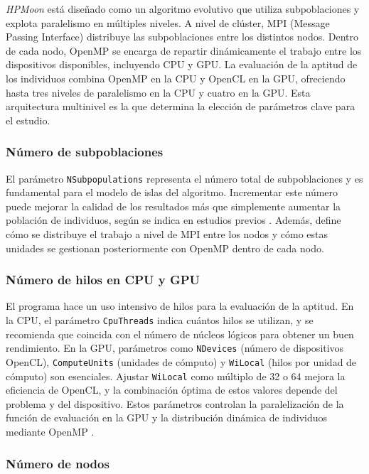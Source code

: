 \textit{HPMoon} está diseñado como un algoritmo evolutivo que utiliza subpoblaciones y explota paralelismo en múltiples niveles. A nivel de clúster, MPI (Message Passing Interface) distribuye las subpoblaciones entre los distintos nodos. Dentro de cada nodo, OpenMP se encarga de repartir dinámicamente el trabajo entre los dispositivos disponibles, incluyendo CPU y GPU. La evaluación de la aptitud de los individuos combina OpenMP en la CPU y OpenCL en la GPU, ofreciendo hasta tres niveles de paralelismo en la CPU y cuatro en la GPU. Esta arquitectura multinivel es la que determina la elección de parámetros clave para el estudio.

\subsubsection{Número de subpoblaciones}

El parámetro \texttt{NSubpopulations} representa el número total de subpoblaciones y es fundamental para el modelo de islas del algoritmo. Incrementar este número puede mejorar la calidad de los resultados más que simplemente aumentar la población de individuos, según se indica en estudios previos \cite{escobar2020energy}. Además, define cómo se distribuye el trabajo a nivel de MPI entre los nodos y cómo estas unidades se gestionan posteriormente con OpenMP dentro de cada nodo.

\subsubsection{Número de hilos en CPU y GPU}

El programa hace un uso intensivo de hilos para la evaluación de la aptitud. En la CPU, el parámetro \texttt{CpuThreads} indica cuántos hilos se utilizan, y se recomienda que coincida con el número de núcleos lógicos para obtener un buen rendimiento. En la GPU, parámetros como \texttt{NDevices} (número de dispositivos OpenCL), \texttt{ComputeUnits} (unidades de cómputo) y \texttt{WiLocal} (hilos por unidad de cómputo) son esenciales. Ajustar \texttt{WiLocal} como múltiplo de 32 o 64 mejora la eficiencia de OpenCL, y la combinación óptima de estos valores depende del problema y del dispositivo. Estos parámetros controlan la paralelización de la función de evaluación en la GPU y la distribución dinámica de individuos mediante OpenMP \cite{escobar2020energy}.

\subsubsection{Número de nodos}

